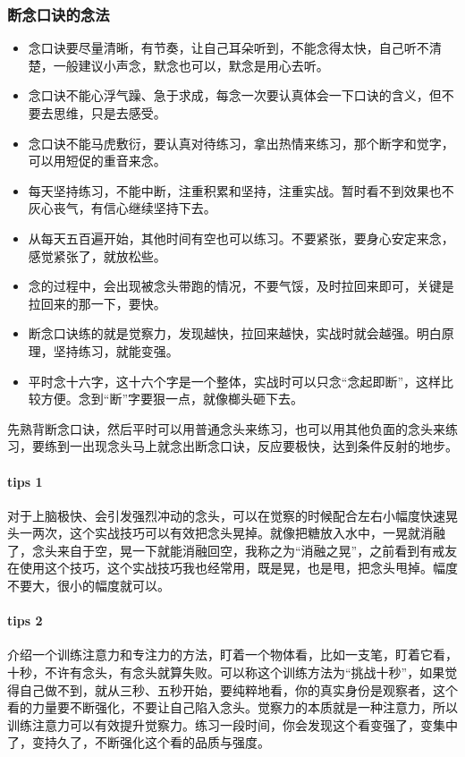 \subsubsection{断念口诀的念法}

\begin{multicols}{2}
    \begin{itemize}
        \item 念口诀要尽量清晰，有节奏，让自己耳朵听到，不能念得太快，自己听不清楚，一般建议小声念，默念也可以，默念是用心去听。
        \item 念口诀不能心浮气躁、急于求成，每念一次要认真体会一下口诀的含义，但不要去思维，只是去感受。
        \item 念口诀不能马虎敷衍，要认真对待练习，拿出热情来练习，那个断字和觉字，可以用短促的重音来念。
        \item 每天坚持练习，不能中断，注重积累和坚持，注重实战。暂时看不到效果也不灰心丧气，有信心继续坚持下去。
        \item 从每天五百遍开始，其他时间有空也可以练习。不要紧张，要身心安定来念，感觉紧张了，就放松些。
        \item 念的过程中，会出现被念头带跑的情况，不要气馁，及时拉回来即可，关键是拉回来的那一下，要快。
        \item 断念口诀练的就是觉察力，发现越快，拉回来越快，实战时就会越强。明白原理，坚持练习，就能变强。
        \item 平时念十六字，这十六个字是一个整体，实战时可以只念“念起即断”，这样比较方便。念到“断”字要狠一点，就像榔头砸下去。
    \end{itemize}
\end{multicols}

先熟背断念口诀，然后平时可以用普通念头来练习，也可以用其他负面的念头来练习，要练到一出现念头马上就念出断念口诀，反应要极快，达到条件反射的地步。

\paragraph{tips 1} 对于上脑极快、会引发强烈冲动的念头，可以在觉察的时候配合左右小幅度快速晃头一两次，这个实战技巧可以有效把念头晃掉。就像把糖放入水中，一晃就消融了，念头来自于空，晃一下就能消融回空，我称之为“消融之晃”，之前看到有戒友在使用这个技巧，这个实战技巧我也经常用，既是晃，也是甩，把念头甩掉。幅度不要大，很小的幅度就可以。

\paragraph{tips 2} 介绍一个训练注意力和专注力的方法，盯着一个物体看，比如一支笔，盯着它看，十秒，不许有念头，有念头就算失败。可以称这个训练方法为“挑战十秒”，如果觉得自己做不到，就从三秒、五秒开始，要纯粹地看，你的真实身份是观察者，这个看的力量要不断强化，不要让自己陷入念头。觉察力的本质就是一种注意力，所以训练注意力可以有效提升觉察力。练习一段时间，你会发现这个看变强了，变集中了，变持久了，不断强化这个看的品质与强度。

